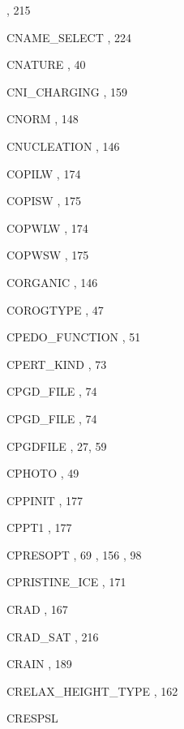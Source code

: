 \begin{theindex}
    \subitem {},  215
  \item CNAME\_SELECT
    \subitem {},  224
  \item CNATURE
    \subitem {},  40
  \item CNI\_CHARGING
    \subitem {},  159
  \item CNORM
    \subitem {},  148
  \item CNUCLEATION
    \subitem {},  146
  \item COPILW
    \subitem {},  174
  \item COPISW
    \subitem {},  175
  \item COPWLW
    \subitem {},  174
  \item COPWSW
    \subitem {},  175
  \item CORGANIC
    \subitem {},  146
  \item COROGTYPE
    \subitem {},  47
  \item CPEDO\_FUNCTION
    \subitem {},  51
  \item CPERT\_KIND 
    \subitem {},  73
  \item CPGD\_FILE
    \subitem {},  74
  \item CPGD\_FILE 
    \subitem {},  74
  \item CPGDFILE
    \subitem {},  27, 59
  \item CPHOTO
    \subitem {},  49
  \item CPPINIT
    \subitem {},  177
  \item CPPT1
    \subitem {},  177
  \item CPRESOPT
    \subitem {},  69
    \subitem {},  156
    \subitem {},  98
  \item CPRISTINE\_ICE
    \subitem {},  171
  \item CRAD
    \subitem {},  167
  \item CRAD\_SAT
    \subitem {},  216
  \item CRAIN
    \subitem {},  189
  \item CRELAX\_HEIGHT\_TYPE
    \subitem {},  162
  \item CRESPSL

\end{theindex}
